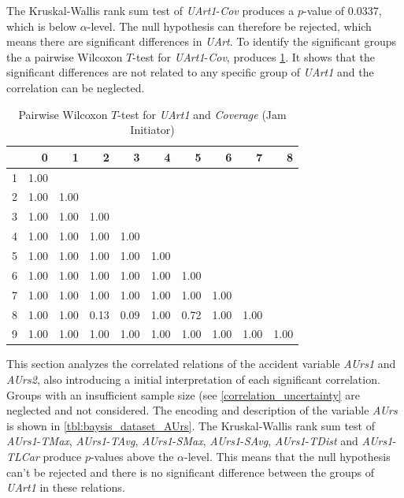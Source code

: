 The Kruskal-Wallis rank sum test of \textit{UArt1}-\textit{Cov} produces a $p$-value of 0.0337, which is below $\alpha$-level. The null hypothesis can therefore be rejected, which means there are significant differences in \textit{UArt}. To identify the significant groups the a pairwise Wilcoxon $T$-test for \textit{UArt1}-\textit{Cov}, produces \cref*{tbl:wilcoxon_baysis_initiator_UArt_Cov}. It shows that the significant differences are not related to any specific group of \textit{UArt1} and the correlation can be neglected.
\begin{table}[ht!]
	\tiny
	\centering
    \begin{tabular}{rrrrrrrrrr}
        \toprule
          & 0 & 1 & 2 & 3 & 4 & 5 & 6 & 7 & 8 \\ 
        \midrule
        1 & 1.00 &  &  &  &  &  &  &  &  \\ 
        2 & 1.00 & 1.00 &  &  &  &  &  &  &  \\ 
        3 & 1.00 & 1.00 & 1.00 &  &  &  &  &  &  \\ 
        4 & 1.00 & 1.00 & 1.00 & 1.00 &  &  &  &  &  \\ 
        5 & 1.00 & 1.00 & 1.00 & 1.00 & 1.00 &  &  &  &  \\ 
        6 & 1.00 & 1.00 & 1.00 & 1.00 & 1.00 & 1.00 &  &  &  \\ 
        7 & 1.00 & 1.00 & 1.00 & 1.00 & 1.00 & 1.00 & 1.00 &  &  \\ 
        8 & 1.00 & 1.00 & 0.13 & 0.09 & 1.00 & 0.72 & 1.00 & 1.00 &  \\ 
        9 & 1.00 & 1.00 & 1.00 & 1.00 & 1.00 & 1.00 & 1.00 & 1.00 & 1.00 \\ 
        \bottomrule
      \end{tabular}
    \caption{Pairwise Wilcoxon $T$-test for \textit{UArt1} and \textit{Coverage} (Jam Initiator)}
    \label{tbl:wilcoxon_baysis_initiator_UArt_Cov}
\end{table}

This section analyzes the correlated relations of the accident variable \textit{AUrs1} and \textit{AUrs2}, also introducing a initial interpretation of each significant correlation. Groups with an insufficient sample size (see \cref{correlation_uncertainty} are neglected and not considered. The encoding and description of the variable \textit{AUrs} is shown in \cref{tbl:baysis_dataset_AUrs}. The Kruskal-Wallis rank sum test of \textit{AUrs1}-\textit{TMax}, \textit{AUrs1}-\textit{TAvg}, \textit{AUrs1}-\textit{SMax}, \textit{AUrs1}-\textit{SAvg}, \textit{AUrs1}-\textit{TDist} and \textit{AUrs1}-\textit{TLCar} produce $p$-values above the $\alpha$-level. This means that the null hypothesis can't be rejected and there is no significant difference between the groups of \textit{UArt1} in these relations. 

